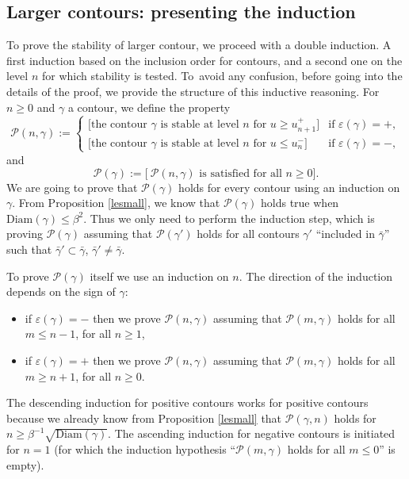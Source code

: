 \documentclass[10pt]{amsart}
\let\mathcal\mathscr
\numberwithin{equation}{section}
\theoremstyle{plain}
\theoremstyle{definition}
\newcommand{\Diam}{\mathrm{Diam}}
\newcommand{\cP}{{\ensuremath{\mathcal P}} }
\newcommand{\gb}{\beta}
\newcommand{\gep}{\varepsilon}
\begin{document}
\subsection{Larger contours: presenting the induction}\label{prezent}

To prove the stability of larger contour, we proceed with a double induction. A first induction based on the inclusion order for contours,
and a second one on the level $n$ for which stability is tested. To~avoid any confusion, before going into the details of the proof,
we provide the structure of this inductive reasoning.
For $n\ge 0$ and $\gamma$ a contour, we define the property
\begin{equation*}
\cP(n,\gamma):=\begin{cases}
\big[ \text{the contour } \gamma \text{ is stable at level } n \text{ for } u\ge u^+_{n+1} \big] &\text{if } \gep(\gamma)=+,\\
\big[ \text{the contour } \gamma \text{ is stable at level } n \text{ for } u\le u^-_{n} \big] &\text{if } \gep(\gamma)=-,
\end{cases}
\end{equation*}
and
\begin{equation*}
\cP(\gamma):=\big[ \ \cP(n,\gamma) \text{ is satisfied for all } n\ge 0 \big].
\end{equation*}
We are going to prove that $\cP(\gamma)$ holds for every contour using an induction on $\gamma$.
From Proposition \ref{lesmall}, we know that $\cP(\gamma)$ holds true when $\Diam(\gamma)\le \gb^2$.
Thus we only need to perform the induction step, which is proving $\cP(\gamma)$ assuming that
$\cP(\gamma')$ holds for all contours $\gamma'$ ``included in $\bar \gamma$'' \ie such that $\bar \gamma' \subset \bar \gamma$, $\bar \gamma'\ne \bar\gamma$.

To prove $\cP(\gamma)$ itself we use an induction on $n$.
The direction of the induction depends on the sign of $\gamma$:
\begin{itemize}
\item if $\gep(\gamma)=-$ then we prove $\cP(n,\gamma)$ assuming that $\cP(m,\gamma)$ holds for all $m\le n-1$, for all $n\ge 1$,
\item if $\gep(\gamma)=+$ then we prove $\cP(n,\gamma)$ assuming that $\cP(m,\gamma)$ holds for all $m\ge n+1$, for all $n\ge 0$.
\end{itemize}
The descending induction for positive contours works for positive contours because we already know from Proposition \ref{lesmall} that $\cP(\gamma,n)$ holds for
$n\ge \gb^{-1} \sqrt{\Diam(\gamma)}$. The ascending induction for negative contours is initiated for $n=1$ (for which the induction hypothesis
``$\cP(m,\gamma)$ holds for all $m\le 0$'' is empty).
\end{document}
